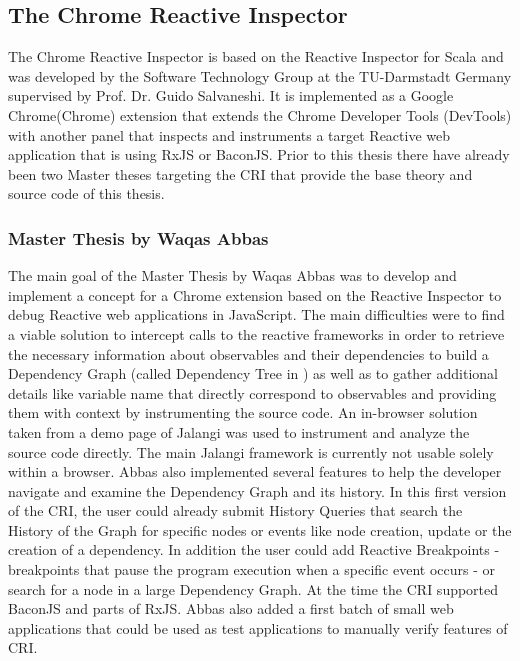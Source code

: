 	\subsection{The Chrome Reactive Inspector}
	\label{sec:PreviousCRI}
	The Chrome Reactive Inspector is based on the Reactive Inspector for Scala \cite{ReactiveInspector} and was developed by the Software Technology Group at the TU-Darmstadt Germany supervised by Prof. Dr. Guido Salvaneshi. It is implemented as a Google Chrome(Chrome) extension that extends the Chrome Developer Tools (DevTools) with another panel that inspects and instruments a target Reactive web application that is using RxJS or BaconJS. Prior to this thesis there have already been two Master theses targeting the CRI that provide the base theory and source code of this thesis.
	\subsubsection{Master Thesis by Waqas Abbas}
	\cite{ThesisAbbas} The main goal of the Master Thesis by Waqas Abbas was to develop and implement a concept for a Chrome extension based on the Reactive Inspector to debug Reactive web applications in JavaScript.
	The main difficulties were to find a viable solution to intercept calls to the reactive frameworks in order to retrieve the necessary information about observables and their dependencies to build a Dependency Graph (called Dependency Tree in \cite{ReactiveInspector}) as well as to gather additional details like variable name that directly correspond to observables and providing them with context by instrumenting the source code. An in-browser solution taken from a demo page \cite{JalangiDemo} of Jalangi was used to instrument and analyze the source code directly. The main Jalangi framework \cite{Jalangi} is currently not usable solely within a browser.
	Abbas also implemented several features to help the developer navigate and examine the Dependency Graph and its history. In this first version of the CRI, the user could already submit History Queries that search the History of the Graph for specific nodes or events like node creation, update or the creation of a dependency. In addition the user could add Reactive Breakpoints - breakpoints that pause the program execution when a specific event occurs - or search for a node in a large Dependency Graph.
	At the time the CRI supported BaconJS\cite{BaconJS} and parts of RxJS\cite{RxJS}. Abbas also added a first batch of small web applications that could be used as test applications to manually verify features of CRI.
		
